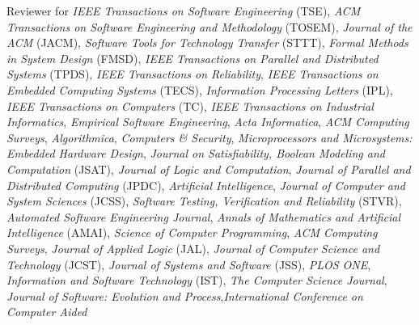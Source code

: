 \documentclass[ComputerScience]{vita}
\begin{document}
\begin{vita}
\begin{Professional Activities and Service}
  \item Reviewer for \emph{IEEE Transactions on Software Engineering} (TSE), \emph{ACM
   Transactions
   on  Software  Engineering  and  Methodology} (TOSEM), \emph{Journal of the ACM} (JACM), 
  \emph{Software Tools for Technology Transfer} (STTT), \emph{Formal
    Methods in System Design} (FMSD), \emph{IEEE Transactions on
    Parallel and Distributed Systems} (TPDS), \emph{IEEE Transactions
    on Reliability}, \emph{IEEE Transactions on Embedded Computing
    Systems} (TECS), \emph{Information Processing Letters} (IPL),
  \emph{IEEE Transactions on Computers} (TC), \emph{IEEE Transactions
    on Industrial Informatics}, \emph{Empirical Software Engineering},
  \emph{Acta Informatica}, \emph{ACM Computing Surveys},
  \emph{Algorithmica}, \emph{Computers \& Security},
  \emph{Microprocessors and Microsystems: Embedded Hardware Design},
  \emph{Journal on Satisfiability, Boolean Modeling and Computation}
  (JSAT), \emph{Journal of Logic and Computation}, \emph{Journal of
    Parallel and Distributed Computing} (JPDC), \emph{Artificial
    Intelligence}, \emph{Journal of Computer and System Sciences}
  (JCSS), \emph{Software Testing, Verification and Reliability}
  (STVR), \emph{Automated Software Engineering Journal}, \emph{Annals
    of Mathematics and Artificial Intelligence} (AMAI), \emph{Science
    of Computer Programming}, \emph{ACM Computing Surveys}, \emph{Journal of Applied Logic} (JAL),
  \emph{Journal of Computer Science and Technology} (JCST),
  \emph{Journal of Systems and Software} (JSS), \emph{PLOS ONE},
  \emph{Information and Software Technology} (IST), \emph{The Computer
    Science Journal}, \emph{Journal of Software: Evolution and Process},\emph{International Conference on Computer Aided
}
\end{Professional Activities and Service}
\end{vita}
\end{document}
